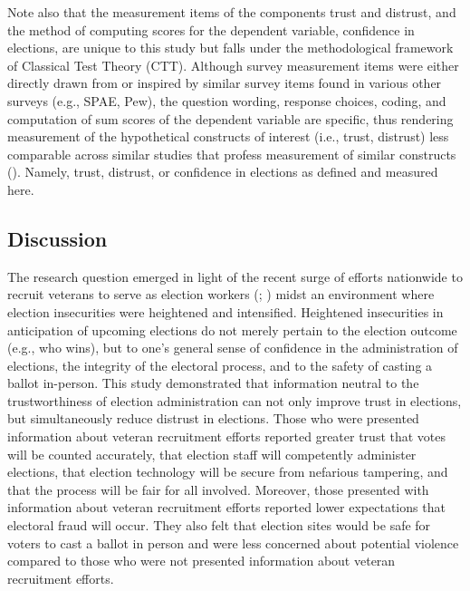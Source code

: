 \documentclass[
  12pt,
  letterpaper,
]{article}
\begin{document}
Note also that the measurement items of the components trust and
distrust, and the method of computing scores for the dependent variable,
confidence in elections, are unique to this study but falls under the
methodological framework of Classical Test Theory (CTT). Although survey
measurement items were either directly drawn from or inspired by similar
survey items found in various other surveys (e.g., SPAE, Pew), the
question wording, response choices, coding, and computation of sum
scores of the dependent variable are specific, thus rendering
measurement of the hypothetical constructs of interest (i.e., trust,
distrust) less comparable across similar studies that profess
measurement of similar constructs (). Namely, trust, distrust, or confidence in elections
as defined and measured here.

\subsection{Discussion}\label{discussion}

The research question emerged in light of the recent surge of efforts
nationwide to recruit veterans to serve as election workers
(;
) midst an environment where
election insecurities were heightened and intensified. Heightened
insecurities in anticipation of upcoming elections do not merely pertain
to the election outcome (e.g., who wins), but to one's general sense of
confidence in the administration of elections, the integrity of the
electoral process, and to the safety of casting a ballot in-person. This
study demonstrated that information neutral to the trustworthiness of
election administration can not only improve trust in elections, but
simultaneously reduce distrust in elections. Those who were presented
information about veteran recruitment efforts reported greater trust
that votes will be counted accurately, that election staff will
competently administer elections, that election technology will be
secure from nefarious tampering, and that the process will be fair for
all involved. Moreover, those presented with information about veteran
recruitment efforts reported lower expectations that electoral fraud
will occur. They also felt that election sites would be safe for voters
to cast a ballot in person and were less concerned about potential
violence compared to those who were not presented information about
veteran recruitment efforts.
\end{document}
